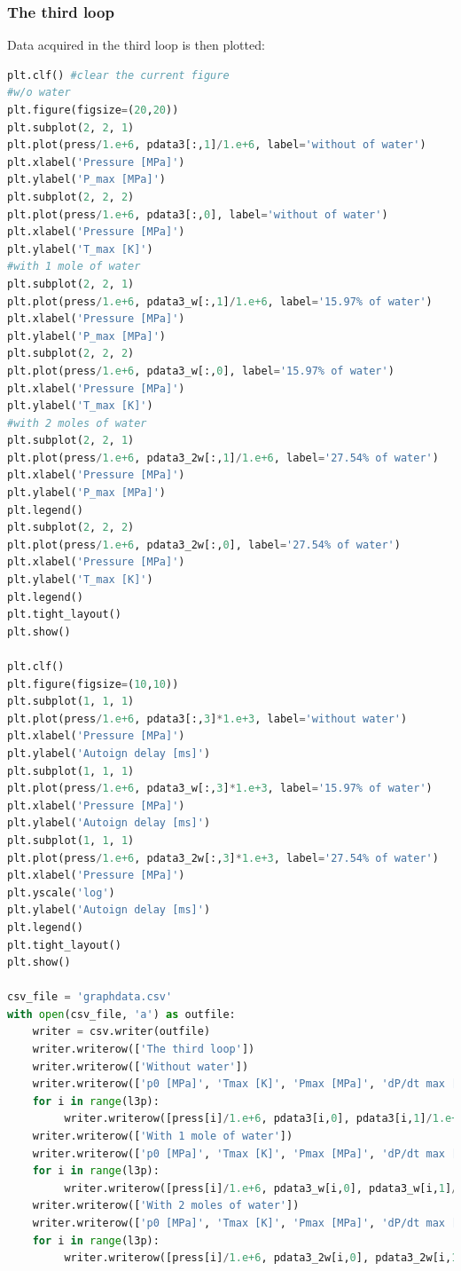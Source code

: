 \documentclass[a4paper]{article}
\begin{document}
\subsubsection{The third loop}
Data acquired in the third loop is then plotted:
\begin{lstlisting}[language=python]
plt.clf() #clear the current figure
#w/o water
plt.figure(figsize=(20,20))
plt.subplot(2, 2, 1)
plt.plot(press/1.e+6, pdata3[:,1]/1.e+6, label='without of water')
plt.xlabel('Pressure [MPa]')
plt.ylabel('P_max [MPa]')
plt.subplot(2, 2, 2)
plt.plot(press/1.e+6, pdata3[:,0], label='without of water')
plt.xlabel('Pressure [MPa]')
plt.ylabel('T_max [K]')
#with 1 mole of water
plt.subplot(2, 2, 1)
plt.plot(press/1.e+6, pdata3_w[:,1]/1.e+6, label='15.97% of water')
plt.xlabel('Pressure [MPa]')
plt.ylabel('P_max [MPa]')
plt.subplot(2, 2, 2)
plt.plot(press/1.e+6, pdata3_w[:,0], label='15.97% of water')
plt.xlabel('Pressure [MPa]')
plt.ylabel('T_max [K]')
#with 2 moles of water
plt.subplot(2, 2, 1)
plt.plot(press/1.e+6, pdata3_2w[:,1]/1.e+6, label='27.54% of water')
plt.xlabel('Pressure [MPa]')
plt.ylabel('P_max [MPa]')
plt.legend()
plt.subplot(2, 2, 2)
plt.plot(press/1.e+6, pdata3_2w[:,0], label='27.54% of water')
plt.xlabel('Pressure [MPa]')
plt.ylabel('T_max [K]')
plt.legend()
plt.tight_layout()
plt.show()       

plt.clf()
plt.figure(figsize=(10,10))
plt.subplot(1, 1, 1)
plt.plot(press/1.e+6, pdata3[:,3]*1.e+3, label='without water')
plt.xlabel('Pressure [MPa]')
plt.ylabel('Autoign delay [ms]')
plt.subplot(1, 1, 1)
plt.plot(press/1.e+6, pdata3_w[:,3]*1.e+3, label='15.97% of water')
plt.xlabel('Pressure [MPa]')
plt.ylabel('Autoign delay [ms]')
plt.subplot(1, 1, 1)
plt.plot(press/1.e+6, pdata3_2w[:,3]*1.e+3, label='27.54% of water')
plt.xlabel('Pressure [MPa]')
plt.yscale('log')
plt.ylabel('Autoign delay [ms]')
plt.legend()
plt.tight_layout()
plt.show()       

csv_file = 'graphdata.csv'
with open(csv_file, 'a') as outfile:
    writer = csv.writer(outfile)
    writer.writerow(['The third loop'])
    writer.writerow(['Without water'])
    writer.writerow(['p0 [MPa]', 'Tmax [K]', 'Pmax [MPa]', 'dP/dt max [MPa/s]', 'adt [s]'])
    for i in range(l3p):
         writer.writerow([press[i]/1.e+6, pdata3[i,0], pdata3[i,1]/1.e+6, pdata3[i,2], pdata3[i,3]])
    writer.writerow(['With 1 mole of water'])
    writer.writerow(['p0 [MPa]', 'Tmax [K]', 'Pmax [MPa]', 'dP/dt max [MPa/s]', 'adt [s]'])
    for i in range(l3p):
         writer.writerow([press[i]/1.e+6, pdata3_w[i,0], pdata3_w[i,1]/1.e+6, pdata3_w[i,2], pdata3_w[i,3]])
    writer.writerow(['With 2 moles of water'])
    writer.writerow(['p0 [MPa]', 'Tmax [K]', 'Pmax [MPa]', 'dP/dt max [MPa/s]', 'adt [s]'])
    for i in range(l3p):
         writer.writerow([press[i]/1.e+6, pdata3_2w[i,0], pdata3_2w[i,1]/1.e+6, pdata3_2w[i,2], pdata3_2w[i,3]])
\end{lstlisting}
\end{document}
